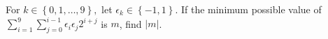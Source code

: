 For $k \in \left \{ 0, 1, \ldots, 9 \right \},$ let $\epsilon_k \in \left \{-1, 1 \right \}$. If the minimum possible value of $\sum_{i = 1}^9 \sum_{j = 0}^{i  -1} \epsilon_i \epsilon_j 2^{i + j}$ is $m$,  find $|m|$.